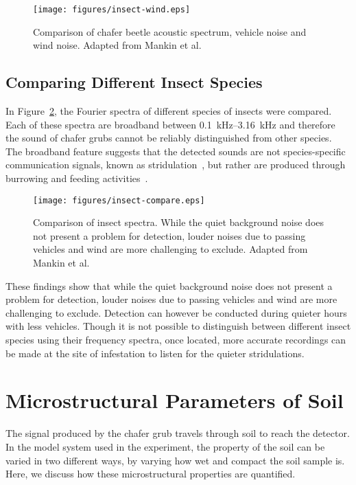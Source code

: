 \documentclass[twocolumn]{article}
\begin{document}
\begin{figure}
    \centering
    \texttt{[image: figures/insect-wind.eps]}
    \caption{Comparison of chafer beetle acoustic spectrum, vehicle noise and wind noise. Adapted from Mankin et al.~\cite{mankin_mccoy_shapiro_1998}}
    \label{fig:insect-wind}
\end{figure}

\subsection{Comparing Different Insect Species}

In Figure~\ref{fig:insect-compare}, the Fourier spectra of different species of insects were compared. Each of these spectra are broadband between \SIrange{0.1}{3.16}{\kilo\hertz} and therefore the sound of chafer grubs cannot be reliably distinguished from other species. The broadband feature suggests that the detected sounds are not species-specific communication signals, known as stridulation~\cite{gorres_chesmore_2019}, but rather are produced through burrowing and feeding activities~\cite{mankin_mccoy_shapiro_1998}.

\begin{figure}
    \centering
    \texttt{[image: figures/insect-compare.eps]}
    \caption{Comparison of insect spectra. While the quiet background noise does not present a problem for detection, louder noises due to passing vehicles and wind are more challenging to exclude. Adapted from Mankin et al.~\cite{mankin_mccoy_shapiro_1998}}
    \label{fig:insect-compare}
\end{figure}

These findings show that while the quiet background noise does not present a problem for detection, louder noises due to passing vehicles and wind are more challenging to exclude. Detection can however be conducted during quieter hours with less vehicles. Though it is not possible to distinguish between different insect species using their frequency spectra, once located, more accurate recordings can be made at the site of infestation to listen for the quieter stridulations.

\section{Microstructural Parameters of Soil}
The signal produced by the chafer grub travels through soil to reach the detector. In the model system used in the experiment, the property of the soil can be varied in two different ways, by varying how wet and compact the soil sample is. Here, we discuss how these microstructural properties are quantified.
\end{document}
